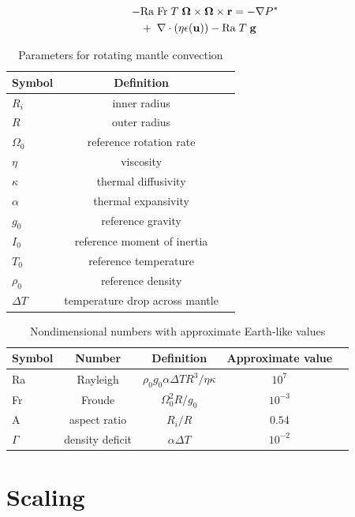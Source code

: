 \documentclass[extra,mreferee]{gji}
\begin{document}
\begin{equation}
\begin{aligned}
 - & \mathrm{Ra \; Fr}\; T \; \mitbf{\Omega} \times \mitbf{\Omega} \times \mathbf{r} = - \nabla P^* \\ 
&+ \; \nabla \cdot \left( \eta \epsilon (\mathbf{u}) \right) - \mathrm{Ra} \; T \; \mathbf{g}
\end{aligned}
\end{equation}

  
\fi

\begin{table}
\centering
\caption{Parameters for rotating mantle convection}
\label{tab:parameters}
\begin{tabular}{@{}lcc}
Symbol & Definition\\
\hline
$R_i$ & inner radius \\
$R$ & outer radius \\
$\Omega_0$ & reference rotation rate \\
$\eta$ & viscosity \\
$\kappa$ & thermal diffusivity \\
$\alpha$ &  thermal expansivity \\ 
$g_0$ & reference gravity \\
$I_0$ & reference moment of inertia \\
$T_0$ & reference temperature \\
$\rho_0$ & reference density \\ 
$\Delta T$ & temperature drop across mantle
\end{tabular}
\end{table}

\begin{table}
\centering
\caption{Nondimensional numbers with approximate Earth-like values}
\label{tab:nondim}
\begin{tabular}{@{}lcccc}
Symbol &  Number & Definition & Approximate value \\
\hline
Ra & Rayleigh &  $\rho_0 g_0 \alpha \Delta T R^3/\eta \kappa$ & $10^7$\\
Fr & Froude & $\Omega_0^2 R/g_0$ & $10^{-3}$ \\
A & aspect ratio & $R_i/R$ & $0.54$ \\
$\Gamma$ & density deficit &$ \alpha \Delta T$ & $10^{-2}$ \\
\end{tabular}
\end{table}
 
\section{Scaling}
\label{sec:scaling}
\end{document}
